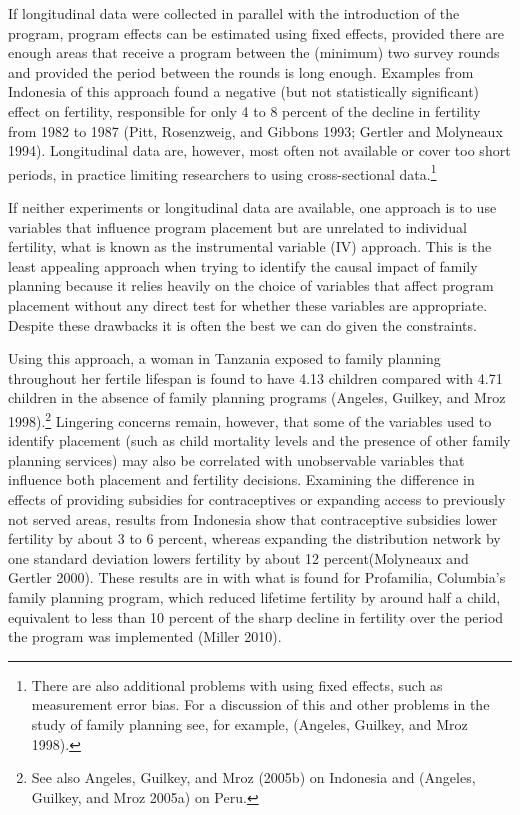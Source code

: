 \documentclass[]{article}
\begin{document}
If longitudinal data were collected in parallel with the introduction of the program, program effects can be estimated using fixed effects, provided there are enough areas that receive a program between the (minimum) two survey rounds and provided the period between the rounds is long enough. Examples from Indonesia of this approach found a negative (but not statistically significant) effect on fertility, responsible for only 4 to 8 percent of the decline in fertility from 1982 to 1987 (Pitt, Rosenzweig, and Gibbons 1993; Gertler and Molyneaux 1994). Longitudinal data are, however, most often not available or cover too short periods, in practice limiting researchers to using cross-sectional data.\footnote{There are also additional problems with using fixed effects, such as measurement error bias. For a discussion of this and other problems in the study of family planning see, for example, (Angeles, Guilkey, and Mroz 1998).}

If neither experiments or longitudinal data are available, one approach is to use variables that influence program placement but are unrelated to individual fertility, what is known as the instrumental variable (IV) approach. This is the least appealing approach when trying to identify the causal impact of family planning because it relies heavily on the choice of variables that affect program placement without any direct test for whether these variables are appropriate. Despite these drawbacks it is often the best we can do given the constraints.

Using this approach, a woman in Tanzania exposed to family planning throughout her fertile lifespan is found to have 4.13 children compared with 4.71 children in the absence of family planning programs (Angeles, Guilkey, and Mroz 1998).\footnote{See also Angeles, Guilkey, and Mroz (2005b) on Indonesia and (Angeles, Guilkey, and Mroz 2005a) on Peru.} Lingering concerns remain, however, that some of the variables used to identify placement (such as child mortality levels and the presence of other family planning services) may also be correlated with unobservable variables that influence both placement and fertility decisions. Examining the difference in effects of providing subsidies for contraceptives or expanding access to previously not served areas, results from Indonesia show that contraceptive subsidies lower fertility by about 3 to 6 percent, whereas expanding the distribution network by one standard deviation lowers fertility by about 12 percent(Molyneaux and Gertler 2000). These results are in with what is found for Profamilia, Columbia's family planning program, which reduced lifetime fertility by around half a child, equivalent to less than 10 percent of the sharp decline in fertility over the period the program was implemented (Miller 2010).
\end{document}
